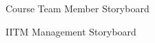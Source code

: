 \begin{figure}[H]
    \centering
        \caption{Course Team Member Storyboard}
    \label{fig:ctm_sb}
\end{figure}
\begin{figure}[H]
    \centering
    \caption{IITM Management Storyboard}
    \label{fig:im_sb}
\end{figure}

